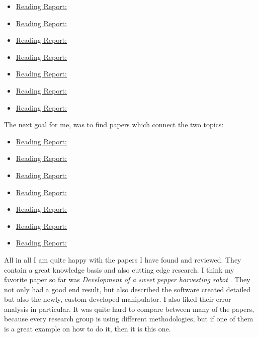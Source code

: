    \begin{itemize}
        \item \hyperref[sec:Arai2002]{Reading Report:} \cite{Arai2002}
        \item \hyperref[sec:Brambilla2013]{Reading Report:} \cite{Brambilla2013}
        \item \hyperref[sec:Chamanbaz2017]{Reading Report:} \cite{Chamanbaz2017}
        \item \hyperref[sec:Gerkey2004]{Reading Report:} \cite{Gerkey2004}
        \item \hyperref[sec:Lerman2006]{Reading Report:} \cite{Lerman2006}
        \item \hyperref[sec:Khamis2015]{Reading Report:} \cite{Khamis2015}
        \item \hyperref[sec:Korsah2013]{Reading Report:} \cite{Korsah2013}
    \end{itemize}
    The next goal for me, was to find papers which connect the two topics: 
    \begin{itemize}
        \item \hyperref[sec:Albani2017]{Reading Report:} \cite{Albani2017}
        \item \hyperref[sec:Albani2019]{Reading Report:} \cite{Albani2019}
        \item \hyperref[sec:Bechar2017]{Reading Report:} \cite{Bechar2017}
        \item \hyperref[sec:ConesaMunoz2015]{Reading Report:} \cite{ConesaMunoz2015}
        \item \hyperref[sec:deSantos2016]{Reading Report:} \cite{deSantos2016}
        \item \hyperref[sec:deSantos2020]{Reading Report:} \cite{deSantos2020}
        \item \hyperref[sec:Vasconez2019]{Reading Report:} \cite{Vasconez2019}
    \end{itemize}

    All in all I am quite happy with the papers I have found and reviewed. They contain a great knowledge basis and also cutting edge research. I think my favorite paper so far was \emph{Development of a sweet pepper harvesting robot} \cite{Arad2020}. They not only had a good end result, but also described the software created detailed but also the newly, custom developed manipulator. I also liked their error analysis in particular. It was quite hard to compare between many of the papers, because every research group is using different methodologies, but if one of them is a great example on how to do it, then it is this one.
   

